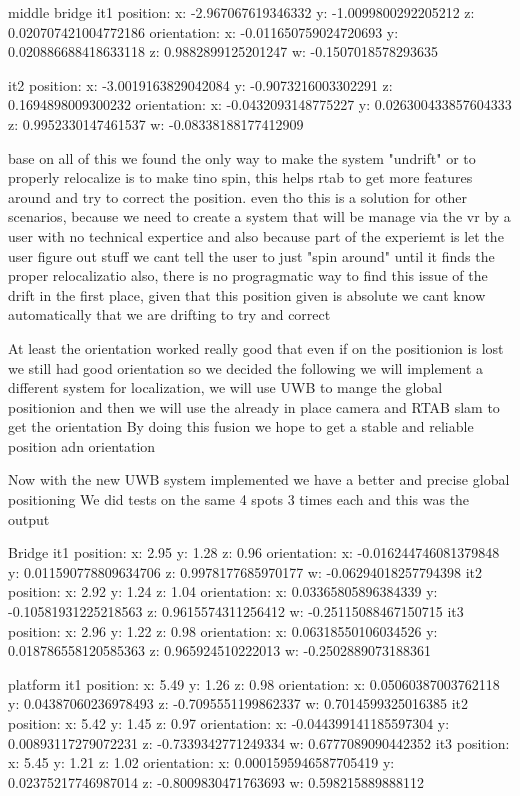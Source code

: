     middle bridge
    it1
    position:
      x: -2.967067619346332
      y: -1.0099800292205212
      z: 0.020707421004772186
    orientation:
      x: -0.011650759024720693
      y: 0.020886688418633118
      z: 0.9882899125201247
      w: -0.1507018578293635

      it2
          position:
      x: -3.0019163829042084
      y: -0.9073216003302291
      z: 0.1694898009300232
    orientation:
      x: -0.0432093148775227
      y: 0.026300433857604333
      z: 0.9952330147461537
      w: -0.08338188177412909


base on all of this we found the only way to make the system "undrift" or to properly relocalize is to make tino spin, this helps rtab to get more features around and try to correct the position.
even tho this is a solution for other scenarios, because we need to create a system that will be manage via the vr by a user with no technical expertice and also because part of the experiemt is let the user figure out stuff we cant tell the user to just "spin around" until it finds the proper relocalizatio
also, there is no progragmatic way to find this issue of the drift in the first place, given that this position given is absolute we cant know automatically that we are drifting to try and correct

At least the orientation worked really good that even if on the positionion is lost we still had good orientation so we decided the following
we will implement a different system for localization, we will use UWB to mange the global positionion and then we will use the already in place camera and RTAB slam to get the orientation
By doing this fusion we hope to get a stable and reliable position adn orientation


Now with the new UWB system implemented we have a better and precise global positioning
We did tests on the same 4 spots 3 times each and this was the output

Bridge
it1
  position:
    x: 2.95
    y: 1.28
    z: 0.96
  orientation:
    x: -0.016244746081379848
    y: 0.011590778809634706
    z: 0.9978177685970177
    w: -0.06294018257794398
it2
position:
    x: 2.92
    y: 1.24
    z: 1.04
  orientation:
    x: 0.03365805896384339
    y: -0.10581931225218563
    z: 0.9615574311256412
    w: -0.25115088467150715
it3
  position:
    x: 2.96
    y: 1.22
    z: 0.98
  orientation:
    x: 0.06318550106034526
    y: 0.018786558120585363
    z: 0.965924510222013
    w: -0.2502889073188361

platform
it1
  position:
    x: 5.49
    y: 1.26
    z: 0.98
  orientation:
    x: 0.05060387003762118
    y: 0.04387060236978493
    z: -0.7095551199862337
    w: 0.7014599325016385
it2
  position:
    x: 5.42
    y: 1.45
    z: 0.97
  orientation:
    x: -0.044399141185597304
    y: 0.00893117279072231
    z: -0.7339342771249334
    w: 0.6777089090442352
it3
  position:
    x: 5.45
    y: 1.21
    z: 1.02
  orientation:
    x: 0.0001595946587705419
    y: 0.02375217746987014
    z: -0.8009830471763693
    w: 0.598215889888112


